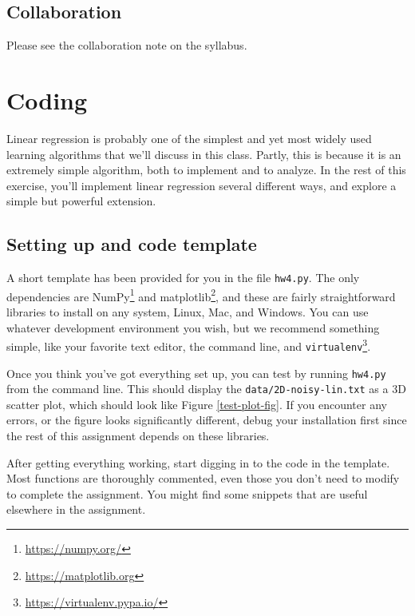 \documentclass{article} %
\begin{document}
\subsection*{Collaboration}
Please see the collaboration note on the syllabus.

\section*{Coding}
Linear regression is probably one of the simplest and yet most widely used learning algorithms that we'll discuss in this 
class. Partly, this is because it is an extremely simple algorithm, both to implement and to analyze. In the rest of this exercise, you'll 
implement linear regression several different ways, and explore a simple but powerful extension.

\subsection*{Setting up and code template}
A short template has been provided for you in the file \texttt{hw4.py}. The only dependencies are 
NumPy\footnote{\url{https://numpy.org/}} and matplotlib\footnote{\url{https://matplotlib.org}}, and these are fairly 
straightforward libraries to install on any system, Linux, Mac, and Windows. You can use whatever development environment you 
wish, but we recommend something simple, like your favorite text editor, the command line, and 
\texttt{virtualenv}\footnote{\url{https://virtualenv.pypa.io/}}.

Once you think you've got everything set up, you can test by running \texttt{hw4.py} from the command line. This should 
display the \texttt{data/2D-noisy-lin.txt} as a 3D scatter plot, which should look like Figure \ref{test-plot-fig}. If you 
encounter any errors, or the figure looks significantly different, debug your installation first since the rest of this 
assignment depends on these libraries.

After getting everything working, start digging in to the code in the template. Most functions are thoroughly commented, even 
those you don't need to modify to complete the assignment. You might find some snippets that are useful elsewhere in the assignment.
\end{document}
